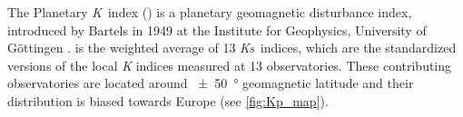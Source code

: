 The Planetary \textit{K}~index (\Kp{}) is a planetary geomagnetic disturbance index, introduced by Bartels in 1949 at the Institute for Geophysics, University of Göttingen \citep{Bartels1949}. \Kp{} is the weighted average of 13 \textit{Ks}~indices, which are the standardized versions of the local \textit{K} indices measured at 13 observatories. These contributing observatories are located around \SI{+-50}{\degree} geomagnetic latitude and their distribution is biased towards Europe (see \autoref{fig:Kp_map}).
\begin{figure}[htb]
\end{figure}


